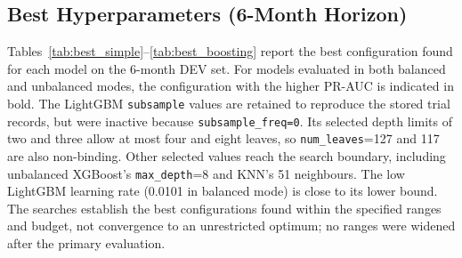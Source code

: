 \subsection{Best Hyperparameters (6-Month Horizon)}
\label{app:best_params}

Tables~\ref{tab:best_simple}--\ref{tab:best_boosting} report the best configuration found for each model on the 6-month DEV set.
For models evaluated in both balanced and unbalanced modes, the configuration with the higher PR-AUC is indicated in bold.
The LightGBM \texttt{subsample} values are retained to reproduce the stored trial records, but were inactive because \texttt{subsample\_freq=0}.
Its selected depth limits of two and three allow at most four and eight leaves, so \texttt{num\_leaves}=127 and 117 are also non-binding. Other selected values reach the search boundary, including unbalanced XGBoost's \texttt{max\_depth}=8 and KNN's 51 neighbours. The low LightGBM learning rate (0.0101 in balanced mode) is close to its lower bound. The searches establish the best configurations found within the specified ranges and budget, not convergence to an unrestricted optimum; no ranges were widened after the primary evaluation.

